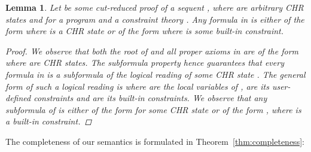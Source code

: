 \documentclass[acmtocl]{acmtrans2m}
\newtheorem{lemma}[theorem]{Lemma}
\begin{document}
\begin{lemma}
\label{lemma:proof-structure}
Let  be some cut-reduced proof of a sequent , where
 are arbitrary CHR states and  for a program
 and a constraint theory . Any formula  in  is either of the form
 where  is a CHR state or of the form
 where  is some built-in constraint.
\begin{proof}
We observe that both the root of  and all proper axioms in  are of
the form  where  are CHR states. The subformula property hence
guarantees that every formula  in  is a subformula of the logical
reading  of some CHR state . The general form of such a logical reading
is  where  are the local
variables of ,  are its user-defined
constraints and  are its built-in constraints.
We observe that any subformula  of  is either of the form
 for some CHR state  or of the form
, where  is a built-in constraint.
\end{proof}
\end{lemma}

The completeness of our semantics is formulated in
Theorem~\ref{thm:completeness}:
\end{document}

